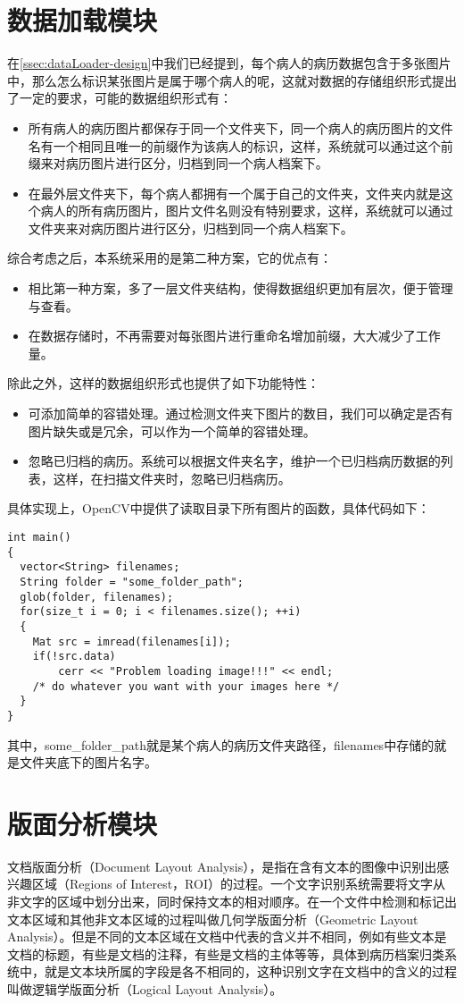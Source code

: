 \section{数据加载模块}  %
在\autoref{ssec:dataLoader-design}中我们已经提到，每个病人的病历数据包含于多张图片中，那么怎么标识某张图片是属于哪个病人的呢，这就对数据的存储组织形式提出了一定的要求，可能的数据组织形式有：
\begin{itemize}
	\item 所有病人的病历图片都保存于同一个文件夹下，同一个病人的病历图片的文件名有一个相同且唯一的前缀作为该病人的标识，这样，系统就可以通过这个前缀来对病历图片进行区分，归档到同一个病人档案下。
	\item 在最外层文件夹下，每个病人都拥有一个属于自己的文件夹，文件夹内就是这个病人的所有病历图片，图片文件名则没有特别要求，这样，系统就可以通过文件夹来对病历图片进行区分，归档到同一个病人档案下。
\end{itemize}
综合考虑之后，本系统采用的是第二种方案，它的优点有：
\begin{itemize}
	\item 相比第一种方案，多了一层文件夹结构，使得数据组织更加有层次，便于管理与查看。
	\item 在数据存储时，不再需要对每张图片进行重命名增加前缀，大大减少了工作量。
\end{itemize}
除此之外，这样的数据组织形式也提供了如下功能特性：
\begin{itemize}
	\item 可添加简单的容错处理。通过检测文件夹下图片的数目，我们可以确定是否有图片缺失或是冗余，可以作为一个简单的容错处理。
	\item 忽略已归档的病历。系统可以根据文件夹名字，维护一个已归档病历数据的列表，这样，在扫描文件夹时，忽略已归档病历。
\end{itemize}
具体实现上，OpenCV中提供了读取目录下所有图片的函数，具体代码如下：
\begin{lstlisting}
int main()
{
  vector<String> filenames;
  String folder = "some_folder_path";
  glob(folder, filenames);
  for(size_t i = 0; i < filenames.size(); ++i)
  {
    Mat src = imread(filenames[i]);
    if(!src.data)
        cerr << "Problem loading image!!!" << endl;
    /* do whatever you want with your images here */
  }
}
\end{lstlisting}
其中，some\_folder\_path就是某个病人的病历文件夹路径，filenames中存储的就是文件夹底下的图片名字。

\section{版面分析模块}  %
文档版面分析（Document Layout Analysis），是指在含有文本的图像中识别出感兴趣区域（Regions of Interest，ROI）的过程。一个文字识别系统需要将文字从非文字的区域中划分出来，同时保持文本的相对顺序\citep{baird1992anatomy}。在一个文件中检测和标记出文本区域和其他非文本区域的过程叫做几何学版面分析（Geometric Layout Analysis）\citep{cattoni1998geometric}。但是不同的文本区域在文档中代表的含义并不相同，例如有些文本是文档的标题，有些是文档的注释，有些是文档的主体等等，具体到病历档案归类系统中，就是文本块所属的字段是各不相同的，这种识别文字在文档中的含义的过程叫做逻辑学版面分析（Logical Layout Analysis）\citep{haralick1994document}。

